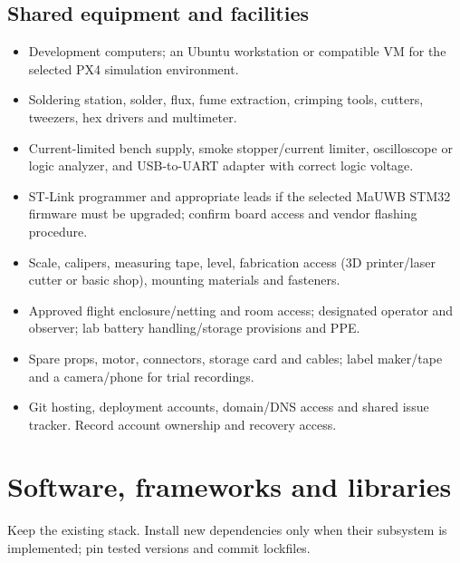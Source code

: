 \documentclass[10pt,letterpaper]{article}
\begin{document}
\subsection{Shared equipment and facilities}
\begin{itemize}
\item Development computers; an Ubuntu workstation or compatible VM for the selected PX4 simulation environment.
\item Soldering station, solder, flux, fume extraction, crimping tools, cutters, tweezers, hex drivers and multimeter.
\item Current-limited bench supply, smoke stopper/current limiter, oscilloscope or logic analyzer, and USB-to-UART adapter with correct logic voltage.
\item ST-Link programmer and appropriate leads if the selected MaUWB STM32 firmware must be upgraded; confirm board access and vendor flashing procedure.
\item Scale, calipers, measuring tape, level, fabrication access (3D printer/laser cutter or basic shop), mounting materials and fasteners.
\item Approved flight enclosure/netting and room access; designated operator and observer; lab battery handling/storage provisions and PPE.
\item Spare props, motor, connectors, storage card and cables; label maker/tape and a camera/phone for trial recordings.
\item Git hosting, deployment accounts, domain/DNS access and shared issue tracker. Record account ownership and recovery access.
\end{itemize}
\section{Software, frameworks and libraries}
Keep the existing stack. Install new dependencies only when their subsystem is implemented; pin tested versions and commit lockfiles.
\end{document}
